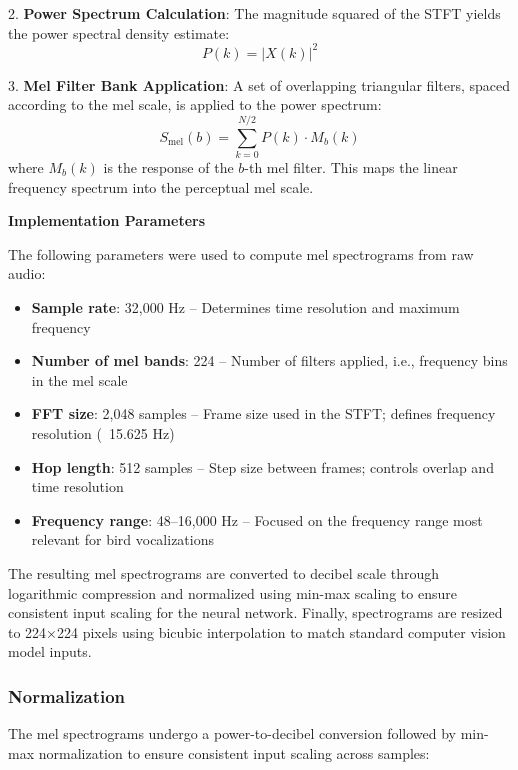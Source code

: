 \documentclass[ERTS, 2025]{ERTS}
\begin{document}
2. \textbf{Power Spectrum Calculation}: The magnitude squared of the STFT yields the power spectral density estimate:
\begin{equation}
P(k) = |X(k)|^2
\end{equation}

3. \textbf{Mel Filter Bank Application}: A set of overlapping triangular filters, spaced according to the mel scale, is applied to the power spectrum:
\begin{equation}
S_{\text{mel}}(b) = \sum_{k=0}^{N/2} P(k) \cdot M_b(k)
\end{equation}
where $M_b(k)$ is the response of the $b$-th mel filter. This maps the linear frequency spectrum into the perceptual mel scale.

\textbf{Implementation Parameters}

The following parameters were used to compute mel spectrograms from raw audio:

\begin{itemize}
    \item \textbf{Sample rate}: 32,000 Hz – Determines time resolution and maximum frequency
    \item \textbf{Number of mel bands}: 224 – Number of filters applied, i.e., frequency bins in the mel scale
    \item \textbf{FFT size}: 2,048 samples – Frame size used in the STFT; defines frequency resolution (~15.625 Hz)
    \item \textbf{Hop length}: 512 samples – Step size between frames; controls overlap and time resolution
    \item \textbf{Frequency range}: 48–16,000 Hz – Focused on the frequency range most relevant for bird vocalizations
\end{itemize}


The resulting mel spectrograms are converted to decibel scale through logarithmic compression and normalized using min-max scaling to ensure consistent input scaling for the neural network. Finally, spectrograms are resized to 224×224 pixels using bicubic interpolation to match standard computer vision model inputs.

\subsubsection{Normalization}
The mel spectrograms undergo a power-to-decibel conversion followed by min-max normalization to ensure consistent input scaling across samples:
\end{document}
